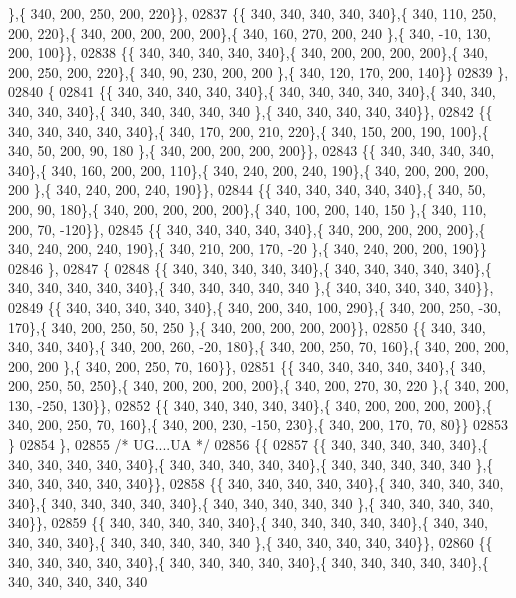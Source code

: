 \begin{DoxyCode}
      \},\{ 340, 200, 250, 200, 220\}\},
02837 \{\{ 340, 340, 340, 340, 340\},\{ 340, 110, 250, 200, 220\},\{ 340, 200, 200, 200, 200\},\{ 340, 160, 270, 200, 240
      \},\{ 340, -10, 130, 200, 100\}\},
02838 \{\{ 340, 340, 340, 340, 340\},\{ 340, 200, 200, 200, 200\},\{ 340, 200, 250, 200, 220\},\{ 340,  90, 230, 200, 200
      \},\{ 340, 120, 170, 200, 140\}\}
02839 \},
02840 \{
02841 \{\{ 340, 340, 340, 340, 340\},\{ 340, 340, 340, 340, 340\},\{ 340, 340, 340, 340, 340\},\{ 340, 340, 340, 340, 340
      \},\{ 340, 340, 340, 340, 340\}\},
02842 \{\{ 340, 340, 340, 340, 340\},\{ 340, 170, 200, 210, 220\},\{ 340, 150, 200, 190, 100\},\{ 340,  50, 200,  90, 180
      \},\{ 340, 200, 200, 200, 200\}\},
02843 \{\{ 340, 340, 340, 340, 340\},\{ 340, 160, 200, 200, 110\},\{ 340, 240, 200, 240, 190\},\{ 340, 200, 200, 200, 200
      \},\{ 340, 240, 200, 240, 190\}\},
02844 \{\{ 340, 340, 340, 340, 340\},\{ 340,  50, 200,  90, 180\},\{ 340, 200, 200, 200, 200\},\{ 340, 100, 200, 140, 150
      \},\{ 340, 110, 200,  70, -120\}\},
02845 \{\{ 340, 340, 340, 340, 340\},\{ 340, 200, 200, 200, 200\},\{ 340, 240, 200, 240, 190\},\{ 340, 210, 200, 170, -20
      \},\{ 340, 240, 200, 200, 190\}\}
02846 \},
02847 \{
02848 \{\{ 340, 340, 340, 340, 340\},\{ 340, 340, 340, 340, 340\},\{ 340, 340, 340, 340, 340\},\{ 340, 340, 340, 340, 340
      \},\{ 340, 340, 340, 340, 340\}\},
02849 \{\{ 340, 340, 340, 340, 340\},\{ 340, 200, 340, 100, 290\},\{ 340, 200, 250, -30, 170\},\{ 340, 200, 250,  50, 250
      \},\{ 340, 200, 200, 200, 200\}\},
02850 \{\{ 340, 340, 340, 340, 340\},\{ 340, 200, 260, -20, 180\},\{ 340, 200, 250,  70, 160\},\{ 340, 200, 200, 200, 200
      \},\{ 340, 200, 250,  70, 160\}\},
02851 \{\{ 340, 340, 340, 340, 340\},\{ 340, 200, 250,  50, 250\},\{ 340, 200, 200, 200, 200\},\{ 340, 200, 270,  30, 220
      \},\{ 340, 200, 130, -250, 130\}\},
02852 \{\{ 340, 340, 340, 340, 340\},\{ 340, 200, 200, 200, 200\},\{ 340, 200, 250,  70, 160\},\{ 340, 200, 230, -150, 
      230\},\{ 340, 200, 170,  70,  80\}\}
02853 \}
02854 \},
02855 \textcolor{comment}{/* UG....UA */}
02856 \{\{
02857 \{\{ 340, 340, 340, 340, 340\},\{ 340, 340, 340, 340, 340\},\{ 340, 340, 340, 340, 340\},\{ 340, 340, 340, 340, 340
      \},\{ 340, 340, 340, 340, 340\}\},
02858 \{\{ 340, 340, 340, 340, 340\},\{ 340, 340, 340, 340, 340\},\{ 340, 340, 340, 340, 340\},\{ 340, 340, 340, 340, 340
      \},\{ 340, 340, 340, 340, 340\}\},
02859 \{\{ 340, 340, 340, 340, 340\},\{ 340, 340, 340, 340, 340\},\{ 340, 340, 340, 340, 340\},\{ 340, 340, 340, 340, 340
      \},\{ 340, 340, 340, 340, 340\}\},
02860 \{\{ 340, 340, 340, 340, 340\},\{ 340, 340, 340, 340, 340\},\{ 340, 340, 340, 340, 340\},\{ 340, 340, 340, 340, 340

\end{DoxyCode}
